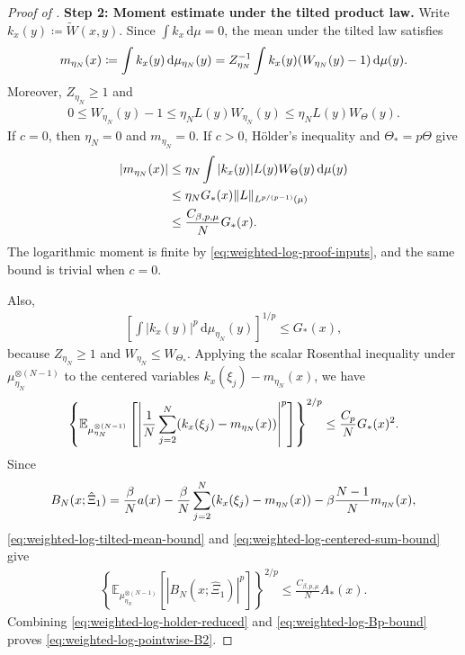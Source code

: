 \documentclass[11pt,reqno]{amsart}
\numberwithin{equation}{section}
\theoremstyle{plain}
\theoremstyle{remark}
\DeclarePairedDelimiter{\pa}{\lparen}{\rparen}
\DeclarePairedDelimiter{\norm}{\lVert}{\rVert}
\newcommand{\md}{\mathrm{d}}
\newcommand{\E}{{\mathbb{E}}}
\newcommand{\tl}{\widetilde}
\newcommand{\be}{\beta}
\newcommand{\step}[1]{\par\medskip\noindent\textbf{#1}}
\begin{document}
\begin{proof}[Proof of ]
\step{Step 2: Moment estimate under the tilted product law.}
Write \(k_x(y)\coloneqq \tl W(x,y)\).  Since \(\int k_x\,\md\mu=0\), the mean under the tilted law satisfies
\begin{align}\label{eq:weighted-log-tilted-mean}
 m_{\eta_N}(x)
 \coloneqq \int k_x(y)\,\md\mu_{\eta_N}(y)
 =Z_{\eta_N}^{-1}\int k_x(y)\pa{W_{\eta_N}(y)-1}\,\md\mu(y).
\end{align}
Moreover, \(Z_{\eta_N}\ge1\) and
\begin{align}\label{eq:weighted-log-weight-increment}
 0\le W_{\eta_N}(y)-1
 \le \eta_N L(y)W_{\eta_N}(y)
 \le \eta_N L(y)W_\Theta(y).
\end{align}
If \(c=0\), then \(\eta_N=0\) and \(m_{\eta_N}=0\).  If \(c>0\), H\"older's inequality and \(\Theta_*=p\Theta\) give
\begin{align}\label{eq:weighted-log-tilted-mean-bound}
 |m_{\eta_N}(x)|
 &\le \eta_N
 \int |k_x(y)|L(y)W_\Theta(y)\,\md\mu(y)\notag\\
 &\le \eta_N G_*(x)\norm{L}_{L^{p/(p-1)}(\mu)}\notag\\
 &\le \frac{C_{\be,p,\mu}}{N}G_*(x).
\end{align}
The logarithmic moment is finite by \eqref{eq:weighted-log-proof-inputs}, and the same bound is trivial when \(c=0\).

Also,
\begin{align}\label{eq:weighted-log-weighted-section}
 \left[\int |k_x(y)|^p\,\md\mu_{\eta_N}(y)\right]^{1/p}
 \le G_*(x),
\end{align}
because \(Z_{\eta_N}\ge1\) and \(W_{\eta_N}\le W_{\Theta_*}\).  Applying the scalar Rosenthal inequality under \(\mu_{\eta_N}^{\otimes(N-1)}\) to the centered variables \(k_x(\xi_j)-m_{\eta_N}(x)\), we have
\begin{align}\label{eq:weighted-log-centered-sum-bound}
 \left\{\E_{\mu_{\eta_N}^{\otimes(N-1)}}\left[
 \left|\frac1N\sum_{j=2}^N\pa{k_x(\xi_j)-m_{\eta_N}(x)}\right|^p\right]\right\}^{2/p}
 \le \frac{C_p}{N}G_*(x)^2.
\end{align}
Since
\begin{align}\label{eq:weighted-log-cavity-decomposition}
 B_N(x;\hat\Xi_1)
 =\frac{\be}{N}a(x)
 -\frac{\be}{N}\sum_{j=2}^N\pa{k_x(\xi_j)-m_{\eta_N}(x)}
 -\be\frac{N-1}{N}m_{\eta_N}(x),
\end{align}
\eqref{eq:weighted-log-tilted-mean-bound} and \eqref{eq:weighted-log-centered-sum-bound} give
\begin{align}\label{eq:weighted-log-Bp-bound}
 \left\{\E_{\mu_{\eta_N}^{\otimes(N-1)}}\left[
 |B_N(x;\hat\Xi_1)|^p\right]\right\}^{2/p}
 \le
 \frac{C_{\be,p,\mu}}{N}A_*(x).
\end{align}
Combining \eqref{eq:weighted-log-holder-reduced} and \eqref{eq:weighted-log-Bp-bound} proves \eqref{eq:weighted-log-pointwise-B2}.


\end{proof}
\end{document}

